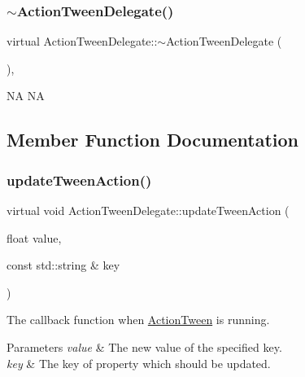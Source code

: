 \subsubsection{\texorpdfstring{$\sim$\+Action\+Tween\+Delegate()}{~ActionTweenDelegate()}\hspace{0.1cm}{\footnotesize\ttfamily [2/2]}}
{\footnotesize\ttfamily virtual Action\+Tween\+Delegate\+::$\sim$\+Action\+Tween\+Delegate (\begin{DoxyParamCaption}{ }\end{DoxyParamCaption})\hspace{0.3cm}{\ttfamily [inline]}, {\ttfamily [virtual]}}

NA  NA 

\subsection{Member Function Documentation}
\mbox{\label{classActionTweenDelegate_a6cb6dce375e29bd38af1a81001eeac66}} 
\subsubsection{\texorpdfstring{update\+Tween\+Action()}{updateTweenAction()}\hspace{0.1cm}{\footnotesize\ttfamily [1/2]}}
{\footnotesize\ttfamily virtual void Action\+Tween\+Delegate\+::update\+Tween\+Action (\begin{DoxyParamCaption}\item[{float}]{value,  }\item[{const std\+::string \&}]{key }\end{DoxyParamCaption})\hspace{0.3cm}{\ttfamily [pure virtual]}}



The callback function when \hyperlink{classActionTween}{Action\+Tween} is running. 


\begin{DoxyParams}{Parameters}
{\em value} & The new value of the specified key. \\
\hline
{\em key} & The key of property which should be updated. \\
\hline
\end{DoxyParams}



